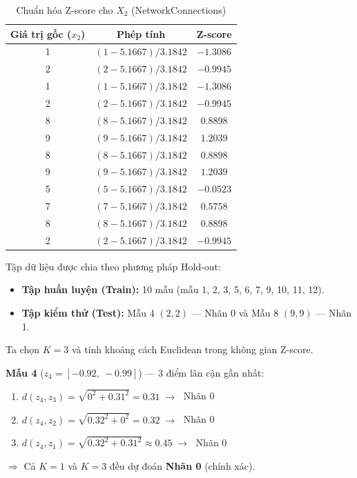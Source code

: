 \documentclass[12pt,a4paper]{article}
\begin{document}
\begin{table}[H]
    \centering
    \caption{Chuẩn hóa Z-score cho $X_2$ (NetworkConnections)}
    \vspace{0.2cm}
    \renewcommand{\arraystretch}{1.4}
    \begin{tabular}{ccc}
        \toprule
        \textbf{Giá trị gốc ($x_2$)} & \textbf{Phép tính} & \textbf{Z-score} \\
        \midrule
        1 & $(1 - 5.1667) / 3.1842$ & $-1.3086$ \\
        2 & $(2 - 5.1667) / 3.1842$ & $-0.9945$ \\
        1 & $(1 - 5.1667) / 3.1842$ & $-1.3086$ \\
        2 & $(2 - 5.1667) / 3.1842$ & $-0.9945$ \\
        8 & $(8 - 5.1667) / 3.1842$ & $0.8898$ \\
        9 & $(9 - 5.1667) / 3.1842$ & $1.2039$ \\
        8 & $(8 - 5.1667) / 3.1842$ & $0.8898$ \\
        9 & $(9 - 5.1667) / 3.1842$ & $1.2039$ \\
        5 & $(5 - 5.1667) / 3.1842$ & $-0.0523$ \\
        7 & $(7 - 5.1667) / 3.1842$ & $0.5758$ \\
        8 & $(8 - 5.1667) / 3.1842$ & $0.8898$ \\
        2 & $(2 - 5.1667) / 3.1842$ & $-0.9945$ \\
        \bottomrule
    \end{tabular}
\end{table}

Tập dữ liệu được chia theo phương pháp Hold-out:
\begin{itemize}
    \item \textbf{Tập huấn luyện (Train):} 10 mẫu (mẫu 1, 2, 3, 5, 6, 7, 9, 10, 11, 12).
    \item \textbf{Tập kiểm thử (Test):} Mẫu 4 $(2, 2)$ — Nhãn 0 và Mẫu 8 $(9, 9)$ — Nhãn 1.
\end{itemize}

Ta chọn $K = 3$ và tính khoảng cách Euclidean trong không gian Z-score.

\medskip
\noindent\textbf{Mẫu 4} ($z_4 = [-0.92,\ -0.99]$) — 3 điểm lân cận gần nhất:
\begin{enumerate}
    \item $d(z_4, z_3) = \sqrt{0^2 + 0.31^2} = 0.31 \;\to\;$ Nhãn 0
    \item $d(z_4, z_2) = \sqrt{0.32^2 + 0^2} = 0.32 \;\to\;$ Nhãn 0
    \item $d(z_4, z_1) = \sqrt{0.32^2 + 0.31^2} \approx 0.45 \;\to\;$ Nhãn 0
\end{enumerate}
$\Rightarrow$ Cả $K = 1$ và $K = 3$ đều dự đoán \textbf{Nhãn 0} (chính xác).
\end{document}
